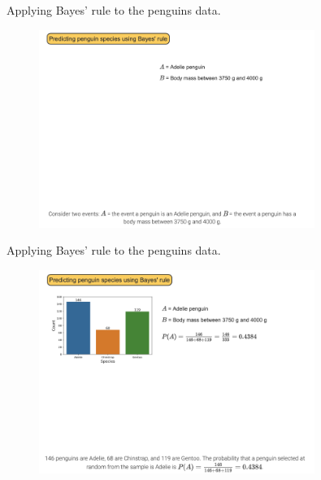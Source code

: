 \documentclass[10pt,dvipsnames]{beamer}
\begin{document}
\begin{frame}{Applying Bayes' rule to the penguins data.}
    \begin{figure}[ht]
        \centering
        \includegraphics[width=0.8\textwidth]{imgs/nb_1.png}
    \end{figure}
\end{frame}

\begin{frame}{Applying Bayes' rule to the penguins data.}
    \begin{figure}[ht]
        \centering
        \includegraphics[width=0.8\textwidth]{imgs/nb_2.png}
    \end{figure}
\end{frame}
\end{document}
